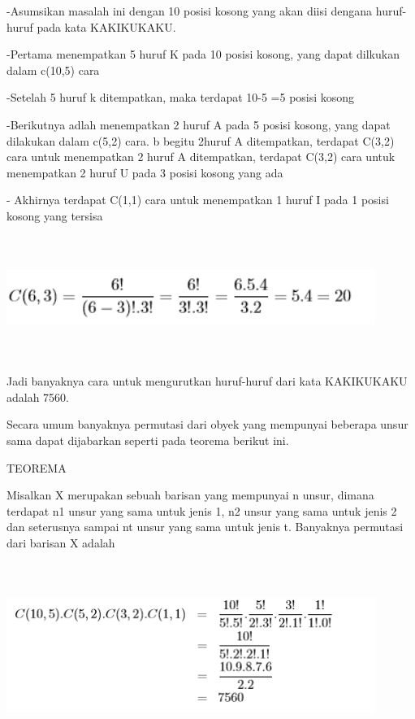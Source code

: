 \documentclass[11pt,fleqn]{book} %
\begin{document}
-Asumsikan masalah ini dengan 10 posisi kosong yang akan diisi dengana huruf-huruf pada kata KAKIKUKAKU.

-Pertama menempatkan 5 huruf K pada 10 posisi kosong, yang dapat dilkukan dalam c(10,5) cara

-Setelah 5 huruf k ditempatkan, maka terdapat 10-5 =5 posisi kosong

-Berikutnya adlah menempatkan 2 huruf A pada 5 posisi kosong, yang dapat dilakukan dalam c(5,2) cara. b begitu 2huruf A ditempatkan, terdapat C(3,2) cara untuk menempatkan 2 huruf A ditempatkan, terdapat C(3,2) cara untuk menempatkan 2 huruf U pada 3 posisi kosong yang ada


- Akhirnya terdapat C(1,1) cara untuk menempatkan 1 huruf I pada 1 posisi kosong yang tersisa

 
\includegraphics[width = 12cm, height= 4cm]{Pictures/herlin11.png}

Jadi banyaknya cara untuk mengurutkan huruf-huruf dari kata KAKIKUKAKU adalah 7560.

Secara umum banyaknya permutasi dari obyek yang mempunyai beberapa unsur sama dapat dijabarkan seperti pada teorema berikut ini.

TEOREMA

Misalkan X merupakan sebuah barisan yang mempunyai n unsur, dimana terdapat n1 unsur yang sama untuk jenis 1, n2 unsur yang sama untuk jenis 2 dan seterusnya sampai nt unsur yang sama untuk jenis t. Banyaknya permutasi dari barisan X adalah

\includegraphics[width = 12cm, height= 6cm]{Pictures/herlin12.png}
\end{document}
